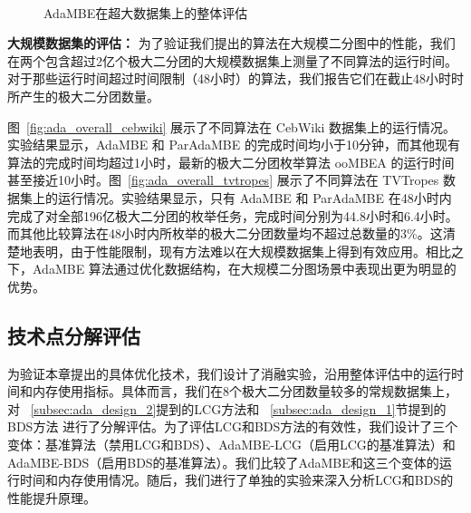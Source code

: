 \begin{figure} [t]
  \centering
	\\

  \caption{AdaMBE在超大数据集上的整体评估}
  \label{fig:ada_overall_large}
\end{figure}

\textbf{大规模数据集的评估：} 为了验证我们提出的算法在大规模二分图中的性能，我们在两个包含超过2亿个极大二分团的大规模数据集上测量了不同算法的运行时间。对于那些运行时间超过时间限制（48小时）的算法，我们报告它们在截止48小时时所产生的极大二分团数量。



图~\ref{fig:ada_overall_cebwiki} 展示了不同算法在 CebWiki 数据集上的运行情况。实验结果显示，AdaMBE 和 ParAdaMBE 的完成时间均小于10分钟，而其他现有算法的完成时间均超过1小时，最新的极大二分团枚举算法 ooMBEA 的运行时间甚至接近10小时。图~\ref{fig:ada_overall_tvtropes} 展示了不同算法在 TVTropes 数据集上的运行情况。实验结果显示，只有 AdaMBE 和 ParAdaMBE 在48小时内完成了对全部196亿极大二分团的枚举任务，完成时间分别为44.8小时和6.4小时。而其他比较算法在48小时内所枚举的极大二分团数量均不超过总数量的3\%。这清楚地表明，由于性能限制，现有方法难以在大规模数据集上得到有效应用。相比之下，AdaMBE 算法通过优化数据结构，在大规模二分图场景中表现出更为明显的优势。

\subsection{技术点分解评估}
\label{subsec:ada_breakdown}

为验证本章提出的具体优化技术，我们设计了消融实验，沿用整体评估中的运行时间和内存使用指标。具体而言，我们在8个极大二分团数量较多的常规数据集上，对
~\ref{subsec:ada_design_2}提到的LCG方法和
~\ref{subsec:ada_design_1}节提到的BDS方法
进行了分解评估。为了评估LCG和BDS方法的有效性，我们设计了三个变体：基准算法（禁用LCG和BDS）、AdaMBE-LCG（启用LCG的基准算法）和AdaMBE-BDS（启用BDS的基准算法）。我们比较了AdaMBE和这三个变体的运行时间和内存使用情况。随后，我们进行了单独的实验来深入分析LCG和BDS的性能提升原理。

